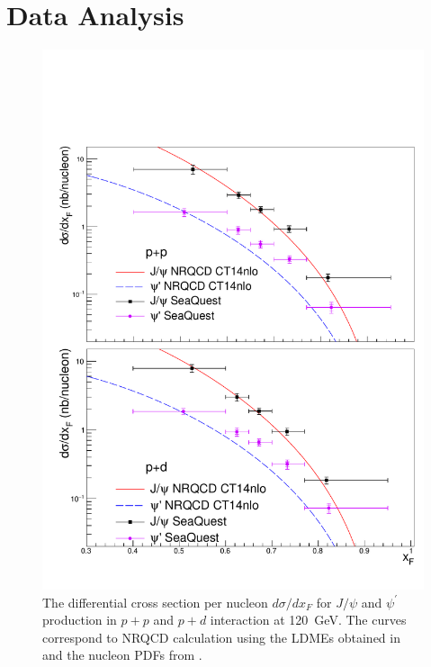 \documentclass[reprint,aps,unsortedaddress,superscriptaddress,prd,floatfix,showpacs,linenumbers]{revtex4-2}
\begin{document}


\section{Data Analysis}

\begin{figure}[tb]
\includegraphics*[width=\linewidth]{crossSections/xF/cs_xF_full}
\caption{The differential cross
section per nucleon $d\sigma / d x_F$ for $J/\psi$ and $\psi^\prime$
production in $p+p$ and $p+d$ interaction at \SI{120}{\GeV}.
The curves correspond to NRQCD calculation using the LDMEs obtained
in \cite{chang2023} and the nucleon PDFs from \cite{hou2021}.}
\label{fig:cs_xF}
\end{figure}
\end{document}
